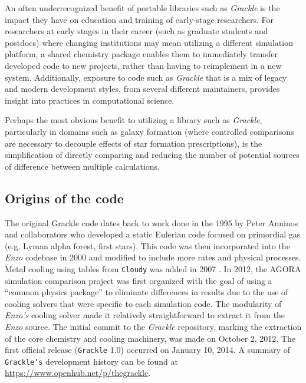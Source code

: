 An often underrecognized benefit of portable libraries such as \textit{Grackle}
is the impact they have on education and training of early-stage researchers.
For researchers at early stages in their career (such as graduate students and
postdocs) where changing institutions may mean utilizing a different simulation
platform, a shared chemistry package enables them to immediately transfer
developed code to new projects, rather than having to reimplement in a new
system.  Additionally, exposure to code such as \textit{Grackle} that is a mix
of legacy and modern development styles, from several different maintainers,
provides insight into practices in computational science.

Perhaps the most obvious benefit to utilizing a library such as
\textit{Grackle}, particularly in domains such as galaxy formation (where
controlled comparisons are necessary to decouple effects of star formation
prescriptions), is the simplification of directly comparing and reducing the
number of potential sources of difference between multiple calculations.

\subsection{Origins of the code}

The original Grackle code dates back to work done in
the 1995 by Peter Anninos and collaborators
\citep{1997NewA....2..209A} who developed a static Eulerian code
focused on primordial gas (e.g. Lyman alpha forest, first stars).
This code was then incorporated into the {\it Enzo} codebase in 2000
and modified to include more rates and physical processes.  Metal
cooling using tables from \texttt{Cloudy} was added in 2007
\citep{2008MNRAS.385.1443S}.  In 2012, the AGORA simulation comparison
project \citep{2014ApJS..210...14K} was first organized with the goal
of using a ``common physics package'' to eliminate differences in
results due to the use of cooling solvers that were specific to each
simulation code.  The modularity of {\it Enzo's} cooling solver made
it relatively straightforward to extract it from the {\it Enzo}
source.  The initial commit to the \textit{Grackle} repository,
marking the extraction of the core chemistry and cooling machinery,
was made on October 2, 2012.  The first official release
(\texttt{Grackle} 1.0) occurred on January 10, 2014.  A summary of
\texttt{Grackle's} development history can be found at
\url{https://www.openhub.net/p/thegrackle}.
